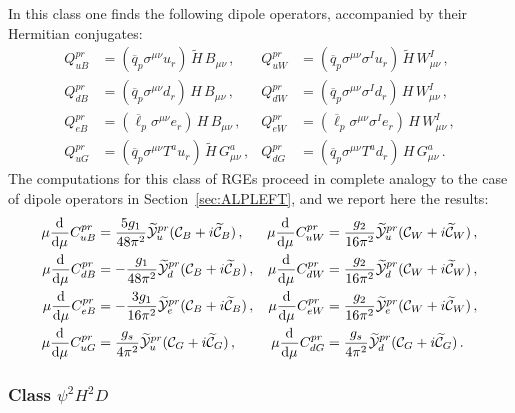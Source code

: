 In this class one finds the following dipole operators, accompanied by their Hermitian
conjugates:
\begin{align}
Q_{uB}^{pr} &= (\overline{q}_p\sigma^{\mu\nu} u_r)\,\widetilde H\,B_{\mu\nu}\,,  &Q_{uW}^{pr} &= (\overline{q}_p\sigma^{\mu\nu} \sigma^I u_r)\,\widetilde H\,W^I_{\mu\nu}\,, \\
 Q_{dB}^{pr} &= (\overline{q}_p\sigma^{\mu\nu} d_r)\,H\,B_{\mu\nu}\,,  & Q_{dW}^{pr} &= (\overline{q}_p\sigma^{\mu\nu} \sigma^I d_r)\,H\,W^I_{\mu\nu} \,,  \\
Q_{eB}^{pr} &= (\overline{\ell}_p\sigma^{\mu\nu} e_r)\,H\,B_{\mu\nu}\,, &Q_{eW}^{pr} &= (\overline{\ell}_p\sigma^{\mu\nu} \sigma^I e_r)\,H\,W^I_{\mu\nu}\,, \\
Q_{uG}^{pr} &= (\overline{q}_p\sigma^{\mu\nu} T^a u_r)\,\widetilde H\,G^a_{\mu\nu}\,, & Q_{dG}^{pr} &= (\overline{q}_p\sigma^{\mu\nu} T^a d_r)\,H\,G^a_{\mu\nu}\,.
\end{align}
The computations for this class of RGEs proceed in complete analogy to the case of dipole
operators in Section~\ref{sec:ALPLEFT}, and we report here the results:
\begin{align}
    \mu \dv[]{}{\mu}  C_{uB}^{pr} &=\frac{5 g_1}{48\pi^2}  \widetilde{\mathcal{Y}}_u^{pr} ({\mathcal{C}}_{B} + i  \widetilde{\mathcal{C}}_{B})\,,
    &
    \mu \dv[]{}{\mu}  C_{uW}^{pr} &=\frac{g_2}{16\pi^2}
 \widetilde{\mathcal{Y}}_u^{pr} ({\mathcal{C}}_{W} + i  \widetilde{\mathcal{C}}_{W})\,,  \\
 \mu \dv[]{}{\mu}  C_{dB}^{pr} &= -\frac{g_1}{48\pi^2}  \widetilde{\mathcal{Y}}_d^{pr} ({\mathcal{C}}_{B} + i  \widetilde{\mathcal{C}}_{B})\,,
    &
    \mu \dv[]{}{\mu}  C_{dW}^{pr} &= \frac{g_2}{16\pi^2}
 \widetilde{\mathcal{Y}}_d^{pr} ({\mathcal{C}}_{W} + i  \widetilde{\mathcal{C}}_{W})\,,  \\
 \mu \dv[]{}{\mu}  C_{eB}^{pr} &= -\frac{3g_1}{16\pi^2}  \widetilde{\mathcal{Y}}_e^{pr} ({\mathcal{C}}_{B} + i  \widetilde{\mathcal{C}}_{B})\,,
    &
    \mu \dv[]{}{\mu}  C_{eW}^{pr} &= \frac{g_2}{16\pi^2}
 \widetilde{\mathcal{Y}}_e^{pr} ({\mathcal{C}}_{W} + i  \widetilde{\mathcal{C}}_{W})\,,  \\
 \mu \dv[]{}{\mu}  C_{uG}^{pr} &= \frac{g_s }{4\pi^2}
 \widetilde{\mathcal{Y}}_u^{pr} ({\mathcal{C}}_{G} +i  \widetilde{\mathcal{C}}_{G})\,, &
 \mu \dv[]{}{\mu}  C_{dG}^{pr} &= \frac{g_s}{4\pi^2}
 \widetilde{\mathcal{Y}}_d^{pr} ({\mathcal{C}}_{G} +i  \widetilde{\mathcal{C}}_{G})\,.
\end{align}

\subsubsection{\texorpdfstring{Class $\psi^2 H^2 D$}{Class psi2 H2 D}}

